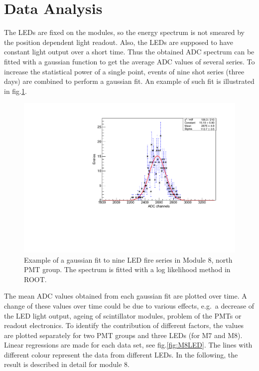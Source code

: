 \section{Data Analysis}
\label{sec:led-ana}
The LEDs are fixed on the modules, so the energy spectrum is not smeared by the position dependent light readout. Also, the LEDs are supposed to have constant light output over a short time. Thus the obtained ADC spectrum can be fitted with a gaussian function to get the average ADC values of several series.
To increase the statistical power of a single point, events of nine shot series (three days) are combined to perform a gaussian fit. An example of such fit is illustrated in fig.\ref{fig:gaussian-fit}.

\begin{figure}[htb!]
  \centering
  \includegraphics[width=0.8\textwidth{}]{./fig/gaussianM8.pdf}
  \caption{Example of a gaussian fit to nine LED fire series in Module 8, north PMT group. The spectrum is fitted with a log likelihood method in ROOT.}
  \label{fig:gaussian-fit}
\end{figure}

The mean ADC values obtained from each gaussian fit are plotted over time. A change of these values over time could be due to various effects, e.g.\ a decrease of the LED light output, ageing of scintillator modules, problem of the PMTs or readout electronics. To identify the contribution of different factors, the values are plotted separately for two PMT groups and three LEDs (for M7 and M8). Linear regressions are made for each data set, see fig.\ref{fig:M8LED}. The lines with different colour represent the data from different LEDs. In the following, the result is described in detail for module 8.

